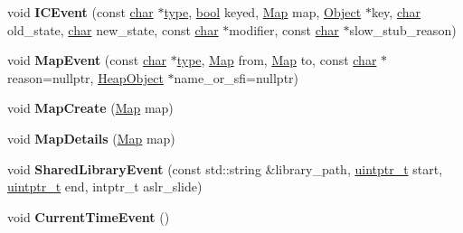 \begin{DoxyCompactItemize}
\item 
\mbox{\label{classv8_1_1internal_1_1Logger_a37d2f63bfa0704d6ca276411cd6e1a3e}} 
void {\bfseries I\+C\+Event} (const \mbox{\hyperlink{classchar}{char}} $\ast$\mbox{\hyperlink{classstd_1_1conditional_1_1type}{type}}, \mbox{\hyperlink{classbool}{bool}} keyed, \mbox{\hyperlink{classv8_1_1internal_1_1Map}{Map}} map, \mbox{\hyperlink{classv8_1_1internal_1_1Object}{Object}} $\ast$key, \mbox{\hyperlink{classchar}{char}} old\+\_\+state, \mbox{\hyperlink{classchar}{char}} new\+\_\+state, const \mbox{\hyperlink{classchar}{char}} $\ast$modifier, const \mbox{\hyperlink{classchar}{char}} $\ast$slow\+\_\+stub\+\_\+reason)
\item 
\mbox{\label{classv8_1_1internal_1_1Logger_a5d129ffe29c1b025b3225875a5904501}} 
void {\bfseries Map\+Event} (const \mbox{\hyperlink{classchar}{char}} $\ast$\mbox{\hyperlink{classstd_1_1conditional_1_1type}{type}}, \mbox{\hyperlink{classv8_1_1internal_1_1Map}{Map}} from, \mbox{\hyperlink{classv8_1_1internal_1_1Map}{Map}} to, const \mbox{\hyperlink{classchar}{char}} $\ast$reason=nullptr, \mbox{\hyperlink{classv8_1_1internal_1_1HeapObject}{Heap\+Object}} $\ast$name\+\_\+or\+\_\+sfi=nullptr)
\item 
\mbox{\label{classv8_1_1internal_1_1Logger_a85d9e6b11de20e5d41fb128a0bec19c1}} 
void {\bfseries Map\+Create} (\mbox{\hyperlink{classv8_1_1internal_1_1Map}{Map}} map)
\item 
\mbox{\label{classv8_1_1internal_1_1Logger_aa2a5c26311e2300e47097e0d094a09d1}} 
void {\bfseries Map\+Details} (\mbox{\hyperlink{classv8_1_1internal_1_1Map}{Map}} map)
\item 
\mbox{\label{classv8_1_1internal_1_1Logger_af12e96b0f6ea17213bc847e06fd10508}} 
void {\bfseries Shared\+Library\+Event} (const std\+::string \&library\+\_\+path, \mbox{\hyperlink{classuintptr__t}{uintptr\+\_\+t}} start, \mbox{\hyperlink{classuintptr__t}{uintptr\+\_\+t}} end, intptr\+\_\+t aslr\+\_\+slide)
\item 
\mbox{\label{classv8_1_1internal_1_1Logger_aa0a465dbed17a0793a716223c0feaecf}} 
void {\bfseries Current\+Time\+Event} ()

\end{DoxyCompactItemize}
